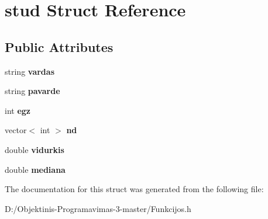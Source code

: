 \hypertarget{structstud}{}\section{stud Struct Reference}
\label{structstud}
\subsection*{Public Attributes}
\begin{DoxyCompactItemize}
\item 
\mbox{\label{structstud_a1a597f1d3c0eb928afdc0e4833e17af6}} 
string {\bfseries vardas}
\item 
\mbox{\label{structstud_a3390e6ce6d4a086574143b879a7da881}} 
string {\bfseries pavarde}
\item 
\mbox{\label{structstud_a4f0cd476d21347c3ded4b71eb5e92090}} 
int {\bfseries egz}
\item 
\mbox{\label{structstud_ab715143fae8186a247051f4a078244a8}} 
vector$<$ int $>$ {\bfseries nd}
\item 
\mbox{\label{structstud_ad6a131f5c8627777b639aa6a3517057c}} 
double {\bfseries vidurkis}
\item 
\mbox{\label{structstud_a1738c5c2b9b3929603845b8d07139566}} 
double {\bfseries mediana}
\end{DoxyCompactItemize}


The documentation for this struct was generated from the following file\+:\begin{DoxyCompactItemize}
\item 
D\+:/\+Objektinis-\/\+Programavimas-\/3-\/master/Funkcijos.\+h\end{DoxyCompactItemize}

